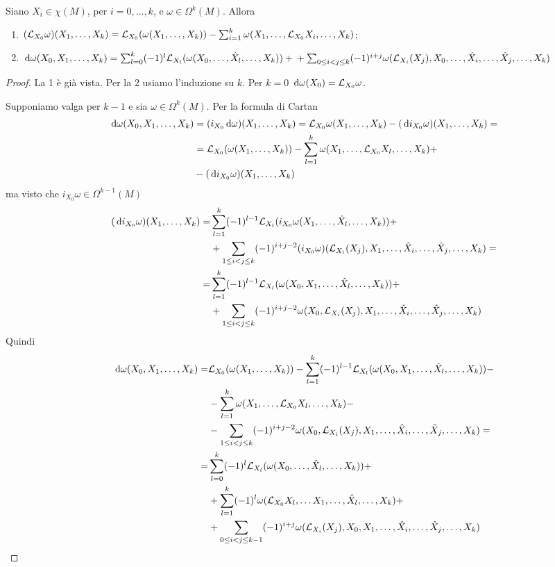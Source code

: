 \begin{proposition}
	Siano $X_i\in\chi(M)$, per $i=0,\ldots,k$, e $\omega \in \Omega^k(M)$. Allora
	\begin{enumerate}
		\item $(\Lie_{X_0} \omega) (\seqb Xk,) = \Lie_{X_0}(\omega(\seqb Xk,)) - \sum_{i=1}^k \omega(X_1,\ldots, \Lie_{X_0}X_i, \ldots, X_k)$;
		\item $\de \omega (X_0,X_1,\ldots,X_k) = \sum_{l=0}^k (-1)^l\Lie_{X_l}(\omega(X_0,\ldots, \hat X_l, \ldots, X_k)) + \\
		+\sum_{0\le i<j\le k}(-1)^{i+j} \omega (\Lie_{X_i}(X_j),X_0,\ldots,\hat X_i,\ldots, \hat X_j,\ldots, X_k)$
	\end{enumerate}
\end{proposition}
\begin{proof}
	La 1 è già vista. Per la 2 usiamo l'induzione su $k$.
	Per $k=0$ $\de \omega (X_0) = \Lie_{X_0} \omega$.
	
	Supponiamo valga per $k-1$ e sia $\omega \in \Omega^k(M)$. Per la formula di Cartan
	\begin{align*}
		\de \omega (X_0,\seqb Xk,) &= (i_{X_0}\de \omega)(\seqb Xk,) = \Lie_{X_0}\omega(\seqb Xk,) - (\de i_{X_0} \omega) (\seqb Xk,) =\\
		&= \Lie_{X_0}(\omega(\seqb Xk,)) - \sum_{l=1}^k \omega (X_1,\ldots,\Lie_{X_0}X_l,\ldots, X_k)+ \\
		&-(\de i_{X_0}\omega) (\seqb Xk,)
	\end{align*}
	ma visto che $i_{X_0}\omega \in \Omega^{k-1}(M)$
	\begin{align*}
		(\de i_{X_0}\omega) (\seqb Xk,) =& \sum_{l=1}^{k} (-1)^{l-1} \Lie_{X_l}(i_{X_0}\omega (X_1,\ldots, \hat X_l, \ldots, X_k)) +\\
		&+\sum_{1\le i< j \le k} (-1)^{i+j-2} (i_{X_0}\omega)(\Lie_{X_i}(X_j),X_1,\ldots, \hat X_i, \ldots, \hat X_j,\ldots, X_k) = \\
		=& \sum_{l=1}^{k} (-1)^{l-1} \Lie_{X_l}(\omega (X_0,X_1,\ldots, \hat X_l, \ldots, X_k)) +\\
		&+\sum_{1\le i< j \le k} (-1)^{i+j-2} \omega(X_0,\Lie_{X_i}(X_j),X_1,\ldots, \hat X_i, \ldots, \hat X_j,\ldots, X_k)
	\end{align*}
	Quindi
	\begin{align*}
		\de \omega (X_0,\seqb Xk,) =& \Lie_{X_0}(\omega(\seqb Xk,)) - \sum_{l=1}^{k} (-1)^{l-1} \Lie_{X_l}(\omega(X_0,X_1, \ldots, \hat X_l,\ldots, X_k)) -\\
		&-\sum_{l=1}^k\omega(X_1,\ldots, \Lie_{X_0}X_l,\ldots,X_k)-\\
		&-\sum_{1\le i<j \le k} (-1)^{i+j-2} \omega (X_0,\Lie_{X_i}(X_j),X_1,\ldots,\hat X_i,\ldots,\hat X_j,\ldots,X_k)=\\
		=&\sum_{l=0}^{k} (-1)^l \Lie_{X_l}(\omega(X_0, \ldots, \hat X_l,\ldots, X_k)) +\\
		&+\sum_{l=1}^k(-1)^l\omega(\Lie_{X_0}X_l,\ldots X_1,\ldots,\hat X_l,\ldots ,X_k)+\\
		&+\sum_{0\le i<j \le k-1} (-1)^{i+j} \omega (\Lie_{X_i}(X_j),X_0,X_1,\ldots,\hat X_i,\ldots,\hat X_j,\ldots,X_k)
	\end{align*}

	
\end{proof}


